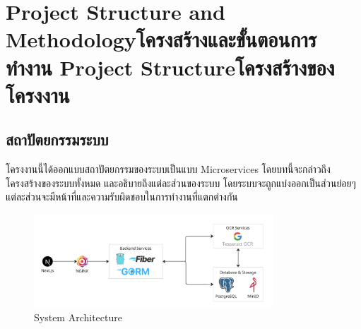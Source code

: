 \chapter{\ifproject%
\ifenglish Project Structure and Methodology\else โครงสร้างและขั้นตอนการทำงาน\fi
\else%
\ifenglish Project Structure\else โครงสร้างของโครงงาน\fi
\fi
}

\makeatletter


\makeatother

\section{สถาปัตยกรรมระบบ}
  \qquad โครงงานนี้ได้ออกแบบสถาปัตยกรรมของระบบเป็นแบบ Microservices โดยบทนี้จะกล่าวถึง
    โครงสร้างของระบบทั้งหมด และอธิบายถึงแต่ละส่วนของระบบ โดยระบบจะถูกแบ่งออกเป็นส่วนย่อยๆ 
    แต่ละส่วนจะมีหน้าที่และความรับผิดชอบในการทำงานที่แตกต่างกัน

    \begin{figure}[!ht]
      \centering
      \includegraphics[width=0.8\textwidth]{image/Approach/Architecture.png}
      \caption[Architecture]{System Architecture}
      \label{fig:architecture}
    \end{figure}
    \FloatBarrier

